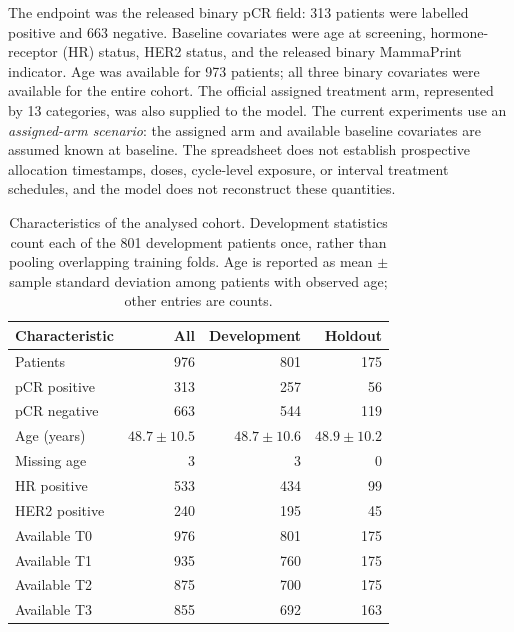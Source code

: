 The endpoint was the released binary pCR field: 313 patients were labelled
positive and 663 negative.  Baseline covariates were age at screening, hormone-receptor
(HR) status, HER2 status, and the released binary MammaPrint indicator. Age was
available for 973 patients; all three binary covariates were available for the
entire cohort. The official assigned treatment arm, represented by 13
categories, was also supplied to the model. The current experiments use an
\emph{assigned-arm scenario}: the assigned arm and available baseline
covariates are assumed known at baseline. The spreadsheet does not establish
prospective allocation timestamps, doses, cycle-level exposure, or interval
treatment schedules, and the model does not reconstruct these quantities.

\begin{table}[t]
\centering
\caption{Characteristics of the analysed cohort. Development statistics count
each of the 801 development patients once, rather than pooling overlapping
training folds. Age is reported as mean $\pm$ sample standard deviation among
patients with observed age; other entries are counts.}
\label{tab:cohort}
\small
\begin{tabular}{lrrr}
\toprule
Characteristic & All & Development & Holdout \\
\midrule
Patients & 976 & 801 & 175 \\
pCR positive & 313 & 257 & 56 \\
pCR negative & 663 & 544 & 119 \\
Age (years) & $48.7\pm10.5$ & $48.7\pm10.6$ & $48.9\pm10.2$ \\
Missing age & 3 & 3 & 0 \\
HR positive & 533 & 434 & 99 \\
HER2 positive & 240 & 195 & 45 \\
Available T0 & 976 & 801 & 175 \\
Available T1 & 935 & 760 & 175 \\
Available T2 & 875 & 700 & 175 \\
Available T3 & 855 & 692 & 163 \\
\bottomrule
\end{tabular}
\end{table}


